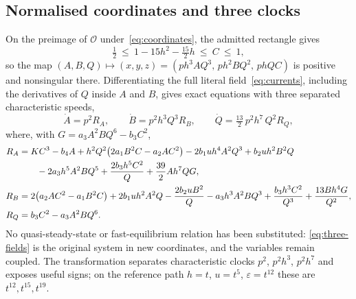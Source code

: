 \documentclass[11pt,a4paper]{article}
\theoremstyle{plain}
\theoremstyle{definition}
\theoremstyle{remark}
\newcommand{\eps}{\varepsilon}
\newcommand{\calO}{\mathcal O}
\begin{document}
\subsection{Normalised coordinates and three clocks}
On the preimage of $\calO$ under~\eqref{eq:coordinates}, the admitted rectangle gives
\begin{equation}\label{eq:C-bound}
 \tfrac12\ \le\ 1-15h^2-\tfrac{15}{2}h\ \le\ C\ \le\ 1,
\end{equation}
so the map $(A,B,Q)\mapsto(x,y,z)=(ph^3AQ^3,\,ph^2BQ^2,\,phQC)$ is positive and nonsingular there. Differentiating the full literal field~\eqref{eq:currents}, including the derivatives of $Q$ inside $A$ and $B$, gives exact equations with three separated characteristic speeds,
\begin{equation}\label{eq:three-fields}
 \dot A=p^2R_A,\qquad \dot B=p^2h^3Q^3R_B,\qquad \dot Q=\tfrac{13}{2}\,p^2h^7\,Q^2R_Q ,
\end{equation}
where, with $G=a_3A^2BQ^6-b_3C^2$,
\begin{align}
 R_A&=KC^3-b_4A+h^2Q^2\big(2a_1B^2C-a_2AC^2\big)-2b_1uh^4A^2Q^3+b_2uh^2B^2Q\notag\\
 &\qquad-2a_3h^5A^2BQ^5+\frac{2b_3h^5C^2}{Q}+\frac{39}{2}Ah^7QG,\label{eq:RA}\\
 R_B&=2\big(a_2AC^2-a_1B^2C\big)+2b_1uh^2A^2Q-\frac{2b_2uB^2}{Q}-a_3h^3A^2BQ^3+\frac{b_3h^3C^2}{Q^3}+\frac{13Bh^4G}{Q^2},\label{eq:RB}\\
 R_Q&=b_3C^2-a_3A^2BQ^6 .\label{eq:RQ}
\end{align}
No quasi-steady-state or fast-equilibrium relation has been substituted: \eqref{eq:three-fields} is the original system in new coordinates, and the variables remain coupled. The transformation separates characteristic clocks $p^2$, $p^2h^3$, $p^2h^7$ and exposes useful signs; on the reference path $h=t$, $u=t^5$, $\eps=t^{12}$ these are $t^{12},t^{15},t^{19}$.
\end{document}
